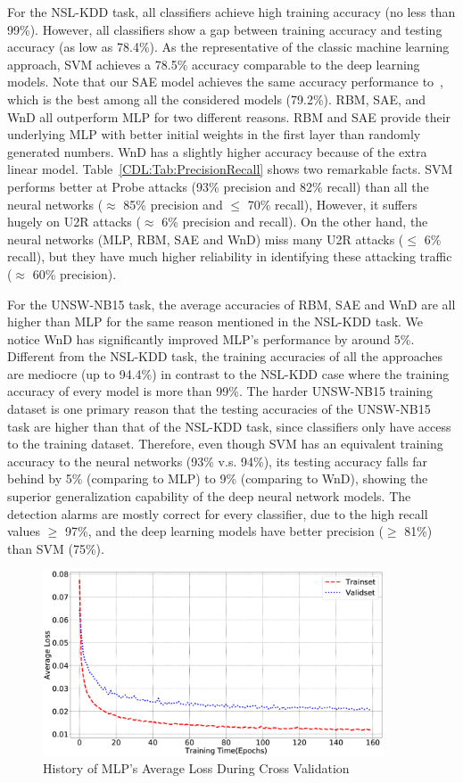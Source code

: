 For the NSL-KDD task, all classifiers achieve high training accuracy (no less than 99\%).
However, all classifiers show a gap between training accuracy and testing accuracy (as low as 78.4\%).
As the representative of the classic machine learning approach, SVM achieves a 78.5\% accuracy
comparable to the deep learning models.
Note that our SAE model achieves the same accuracy performance to~\cite{STL-NIDS}, which is the best among all the considered models (79.2\%).
RBM, SAE, and WnD all outperform MLP for two different reasons.
RBM and SAE provide their underlying MLP with better initial weights in the first layer
than randomly generated numbers.
WnD has a slightly higher accuracy because of the extra linear model.
Table~\ref{CDL:Tab:PrecisionRecall} shows two remarkable facts.
SVM performs better at Probe attacks (93\% precision and 82\% recall)
than all the neural networks ($\approx$ 85\% precision and $\leq$ 70\% recall),
However, it suffers hugely on U2R attacks ($\approx$ 6\% precision and recall).
On the other hand, the neural networks (MLP, RBM, SAE and WnD) miss many U2R attacks ($\leq$ 6\% recall),
but they have much higher reliability in identifying these attacking traffic ($\approx$ 60\% precision).

For the UNSW-NB15 task, the average accuracies of RBM, SAE and WnD are
all higher than MLP for the same reason mentioned in the NSL-KDD task.
We notice WnD has significantly improved MLP's performance by around 5\%.
Different from the NSL-KDD task, the training accuracies of all the approaches are mediocre
(up to 94.4\%) in contrast to the NSL-KDD case where the training accuracy of every model is more than 99\%.
The harder UNSW-NB15 training dataset is one primary reason that the testing accuracies of the UNSW-NB15 task
are higher than that of the NSL-KDD task, since classifiers only have access to the training dataset.
Therefore, even though SVM has an equivalent training accuracy to the neural networks (93\% v.s. 94\%),
its testing accuracy falls far behind by 5\% (comparing to MLP) to 9\% (comparing to WnD),
showing the superior generalization capability of the deep neural network models.
The detection alarms are mostly correct for every classifier,
due to the high recall values $\geq$ 97\%, and the deep learning models have better precision ($\geq$ 81\%) than SVM (75\%).

\begin{figure}[h]
    \centering
    \includegraphics[width=0.9\textwidth]{CompareDL/figures/history.eps}
    \caption{History of MLP's Average Loss During Cross Validation}
    \label{CDL:Fig:LossHistory}
\end{figure}

